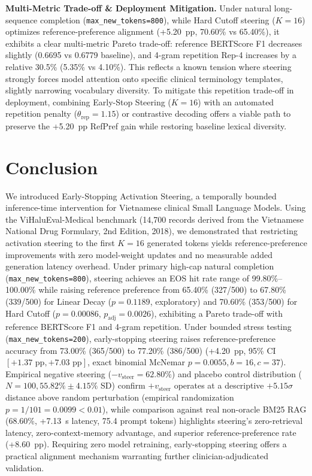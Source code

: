 \documentclass[conference]{IEEEtran}
\begin{document}
\textbf{Multi-Metric Trade-off \& Deployment Mitigation.} Under natural long-sequence completion (\texttt{max\_new\_tokens=800}), while Hard Cutoff steering ($K=16$) optimizes reference-preference alignment (+5.20~pp, 70.60\% vs 65.40\%), it exhibits a clear multi-metric Pareto trade-off: reference BERTScore F1 decreases slightly (0.6695 vs 0.6779 baseline), and 4-gram repetition Rep-4 increases by a relative 30.5\% (5.35\% vs 4.10\%). This reflects a known tension where steering strongly forces model attention onto specific clinical terminology templates, slightly narrowing vocabulary diversity. To mitigate this repetition trade-off in deployment, combining Early-Stop Steering ($K=16$) with an automated repetition penalty ($\theta_{\text{rep}}=1.15$) or contrastive decoding offers a viable path to preserve the +5.20~pp RefPref gain while restoring baseline lexical diversity.

\section{Conclusion}
We introduced Early-Stopping Activation Steering, a temporally bounded inference-time intervention for Vietnamese clinical Small Language Models. Using the ViHaluEval-Medical benchmark (14,700 records derived from the Vietnamese National Drug Formulary, 2nd Edition, 2018), we demonstrated that restricting activation steering to the first $K=16$ generated tokens yields reference-preference improvements with zero model-weight updates and no measurable added generation latency overhead. Under primary high-cap natural completion (\texttt{max\_new\_tokens=800}), steering achieves an EOS hit rate range of 99.80\%--100.00\% while raising reference preference from 65.40\% (327/500) to 67.80\% (339/500) for Linear Decay ($p=0.1189$, exploratory) and 70.60\% (353/500) for Hard Cutoff ($p=0.00086$, $p_{\text{adj}}=0.0026$), exhibiting a Pareto trade-off with reference BERTScore F1 and 4-gram repetition. Under bounded stress testing (\texttt{max\_new\_tokens=200}), early-stopping steering raises reference-preference accuracy from 73.00\% (365/500) to 77.20\% (386/500) (+4.20~pp, 95\% CI $[+1.37\text{ pp}, +7.03\text{ pp}]$, exact binomial McNemar $p=0.0055, b=16, c=37$). Empirical negative steering ($-v_{\text{steer}}=62.80\%$) and placebo control distribution ($N=100, 55.82\%\pm4.15\%$ SD) confirm $+v_{\text{steer}}$ operates at a descriptive $+5.15\sigma$ distance above random perturbation (empirical randomization $p=1/101=0.0099 < 0.01$), while comparison against real non-oracle BM25 RAG (68.60\%, +7.13~s latency, 75.4 prompt tokens) highlights steering's zero-retrieval latency, zero-context-memory advantage, and superior reference-preference rate (+8.60~pp). Requiring zero model retraining, early-stopping steering offers a practical alignment mechanism warranting further clinician-adjudicated validation.
\end{document}
